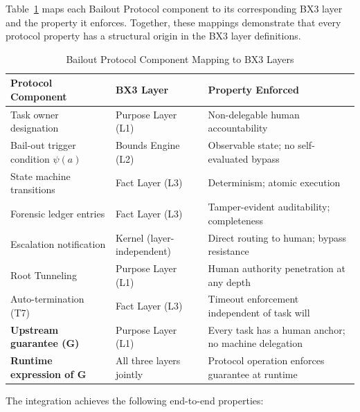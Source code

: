 Table~\ref{tab:bailout-layer-mapping} maps each Bailout Protocol component to its corresponding BX3 layer and the property it enforces. Together, these mappings demonstrate that every protocol property has a structural origin in the BX3 layer definitions.

\begin{table}[htbp]
\centering
\caption{Bailout Protocol Component Mapping to BX3 Layers}
\label{tab:bailout-layer-mapping}
\begin{tabular}{@{}lll@{}}
\toprule
\textbf{Protocol Component} & \textbf{BX3 Layer} & \textbf{Property Enforced} \\
\midrule
Task owner designation & Purpose Layer (L1) & Non-delegable human accountability \\
Bail-out trigger condition $\psi(a)$ & Bounds Engine (L2) & Observable state; no self-evaluated bypass \\
State machine transitions & Fact Layer (L3) & Determinism; atomic execution \\
Forensic ledger entries & Fact Layer (L3) & Tamper-evident auditability; completeness \\
Escalation notification & Kernel (layer-independent) & Direct routing to human; bypass resistance \\
Root Tunneling & Purpose Layer (L1) & Human authority penetration at any depth \\
Auto-termination (T7) & Fact Layer (L3) & Timeout enforcement independent of task will \\
\midrule
\textbf{Upstream guarantee (G)} & Purpose Layer (L1) & Every task has a human anchor; no machine delegation \\
\textbf{Runtime expression of G} & All three layers jointly & Protocol operation enforces guarantee at runtime \\
\bottomrule
\end{tabular}
\end{table}

The integration achieves the following end-to-end properties:

